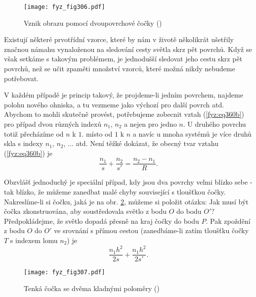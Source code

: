 {    \begin{figure}[ht!] %
      \centering
      \texttt{[image: fyz\_fig306.pdf]}
      \caption{Vznik obrazu pomocí dvoupovrchové čočky
               (\cite[s.~355]{Feynman01})}
      \label{fyz:fig306}
    \end{figure}
    
    Existují některé prvotřídní vzorce, které by nám v životě několikrát ušetřily značnou námahu 
    vynaloženou na sledování cesty světla skrz pět povrchů. Když se však setkáme s takovým 
    problémem, je jednodušší sledovat jeho cestu skrz pět povrchů, než se učit zpaměti množství 
    vzorců, které možná nikdy nebudeme potřebovat.
    
    V každém případě je princip takový, že projdeme-li jedním povrchem, najdeme polohu nového 
    ohniska, a tu vezmeme jako výchozí pro další povrch atd. Abychom to mohli skutečně provést, 
    potřebujeme zobecnit vztah (\ref{fyz:eq360b}) pro případ dvou různých indexů \(n_1\), \(n_2\) a 
    nejen pro jedno \(n\). U druhého povrchu totiž přecházíme od 	\(n\) k \(1\). místo od \(1\) k 
    \(n\) a navíc u mnoha systémů je více druhů skla s indexy \(n_1\), \(n_2\), ... atd. Není těžké 
    dokázat, že obecný tvar vztahu (\ref{fyz:eq360b}) je
    \begin{equation}  \label{fyz:eq364}
      \frac{n_1}{s} + \frac{n_2}{s'} = \frac{n_2-n_1}{R}.    
    \end{equation}
    
    Obzvlášť jednoduchý je speciální případ, kdy jsou dva povrchy velmi blízko sebe - tak blízko, 
    že můžeme zanedbat malé chyby související s tloušťkou čočky. Nakreslíme-li si čočku, jaká je na 
    obr. \ref{fyz:fig307}, můžeme si položit otázku: Jak musí být čočka zkonstruována, aby 
    soustředovala světlo z bodu \(O\) do bodu \(O'\)? Předpokládejme, že světlo dopadá přesně na 
    kraj čočky do bodu \(P\). Pak zpoždění z bodu \(O\) do \(O'\) ve srovnání s přímou cestou 
    (zanedbáme-li zatím tloušťku čočky \(T\) s indexem lomu \(n_2\)) je
    \begin{equation}  \label{fyz:eq365}
      \frac{n_1h^2}{2s} + \frac{n_1h^2}{2s'}.
    \end{equation}
    
    \begin{figure}[ht!] %
       \centering
       \texttt{[image: fyz\_fig307.pdf]}
       \caption{Tenká čočka se dvěma kladnými poloměry
               (\cite[s.~355]{Feynman01})}
       \label{fyz:fig307}
    \end{figure}
    
}
